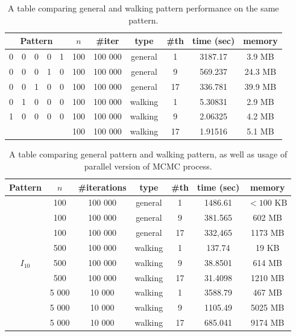 \begin{table}[]
\centering
\begin{tabular}{|ccccc|c|c|c|c|c|c|}
\hline
\multicolumn{5}{|c|}{\textbf{Pattern}} & \textbf{$n$} & \textbf{\#iter} & \textbf{type} & \textbf{\#th} & \textbf{time (sec)} & \textbf{memory} \\ \hline
0 & 0 & 0 & 0 & 1 & 100 & 100 000 & general & 1 & 3187.17 & 3.9 MB \\ \cline{6-11} 
0 & 0 & 0 & 1 & 0 & 100 & 100 000 & general & 9 & 569.237 & 24.3 MB \\ \cline{6-11} 
0 & 0 & 1 & 0 & 0 & 100 & 100 000 & general & 17 & 336.781 & 39.9 MB \\ \cline{6-11} 
0 & 1 & 0 & 0 & 0 & 100 & 100 000 & walking & 1 & 5.30831 & 2.9 MB \\ \cline{6-11} 
1 & 0 & 0 & 0 & 0 & 100 & 100 000 & walking & 9 & 2.06325 & 4.2 MB \\ \cline{6-11} 
 &  &  &  &  & 100 & 100 000 & walking & 17 & 1.91516 & 5.1 MB \\ \hline
\end{tabular}
\caption{A table comparing general and walking pattern performance on the same pattern.}
\label{measurements2}
\end{table}

\begin{table}[]
\centering
\begin{tabular}{|c|c|c|c|c|c|c|}
\hline
\textbf{Pattern} & \textbf{$n$} & \textbf{\#iterations} & \textbf{type} & \textbf{\#th} & \textbf{time (sec)} & \textbf{memory} \\ \hline
\multirow{9}{*}{$I_{10}$} & 100 & 100 000 & general & 1 & 1486.61 & $<100$ KB \\ \cline{2-7} 
 & 100 & 100 000 & general & 9 & 381.565 & 602 MB \\ \cline{2-7} 
 & 100 & 100 000 & general & 17 & 332,465 & 1173 MB \\ \cline{2-7} 
 & 500 & 100 000 & walking & 1 & 137.74 & 19 KB \\ \cline{2-7} 
 & 500 & 100 000 & walking & 9 & 38.8501 & 614 MB \\ \cline{2-7} 
 & 500 & 100 000 & walking & 17 & 31.4098 & 1210 MB \\ \cline{2-7} 
 & 5 000 & 10 000 & walking & 1 & 3588.79 & 467 MB \\ \cline{2-7} 
 & 5 000 & 10 000 & walking & 9 & 1105.49 & 5025 MB \\ \cline{2-7} 
 & 5 000 & 10 000 & walking & 17 & 685.041 & 9174 MB \\ \hline
\end{tabular}
\caption{A table comparing general pattern and walking pattern, as well as usage of parallel version of MCMC process.}
\label{measurements3}
\end{table}